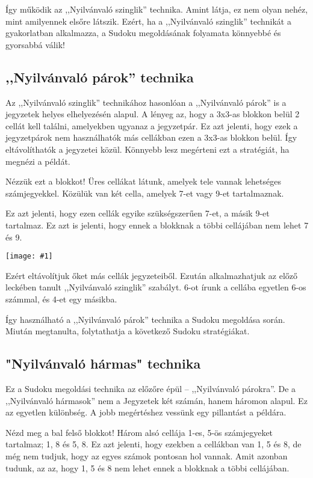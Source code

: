\documentclass[a4paper,12pt,twoside]{article}
\newcommand{\kep}[1]{\texttt{[image: \#1]}}
\begin{document}
Így működik az ,,Nyilvánvaló szinglik'' technika. Amint látja, ez nem olyan nehéz, mint amilyennek elsőre látszik. Ezért, ha a ,,Nyilvánvaló szinglik'' technikát a gyakorlatban alkalmazza, a Sudoku megoldásának folyamata könnyebbé és gyorsabbá válik!

\clearpage
\subsection{,,Nyilvánvaló párok'' technika}

Az ,,Nyilvánvaló szinglik'' technikához hasonlóan a ,,Nyilvánvaló párok'' is a  jegyzetek helyes elhelyezésén alapul. A lényeg az, hogy a 3x3-as blokkon belül 2 cellát kell találni, amelyekben ugyanaz a jegyzetpár. Ez azt jelenti, hogy ezek a jegyzetpárok nem használhatók más cellákban ezen a 3x3-as blokkon belül. Így eltávolíthatók a jegyzetei közül. Könnyebb lesz megérteni ezt a stratégiát, ha megnézi a példát.

Nézzük ezt a blokkot! Üres cellákat látunk, amelyek tele vannak lehetséges számjegyekkel. Közülük van két cella, amelyek 7-et vagy 9-et tartalmaznak.

Ez azt jelenti, hogy ezen cellák egyike szükségszerűen 7-et, a másik 9-et tartalmaz. Ez azt is jelenti, hogy ennek a blokknak a többi cellájában nem lehet 7 és 9.

\kep{1646982773-6. Obvious pairs.png}

Ezért eltávolítjuk őket más cellák jegyzeteiből. Ezután alkalmazhatjuk az előző leckében tanult ,,Nyilvánvaló szinglik'' szabályt. 6-ot írunk a cellába egyetlen 6-os számmal, és 4-et egy másikba.

Így használható a ,,Nyilvánvaló párok'' technika a Sudoku megoldása során. Miután megtanulta, folytathatja a következő Sudoku stratégiákat.


\subsection{"Nyilvánvaló hármas" technika}

Ez a Sudoku megoldási technika az előzőre épül – ,,Nyilvánvaló párokra''. De a ,,Nyilvánvaló hármasok'' nem a Jegyzetek két számán, hanem háromon alapul. Ez az egyetlen különbség. A jobb megértéshez vessünk egy pillantást a példára.

Nézd meg a bal felső blokkot! Három alsó cellája 1-es, 5-ös számjegyeket tartalmaz; 1, 8 és 5, 8. Ez azt jelenti, hogy ezekben a cellákban van 1, 5 és 8, de még nem tudjuk, hogy az egyes számok pontosan hol vannak. Amit azonban tudunk, az az, hogy 1, 5 és 8 nem lehet ennek a blokknak a többi cellájában.
\end{document}
